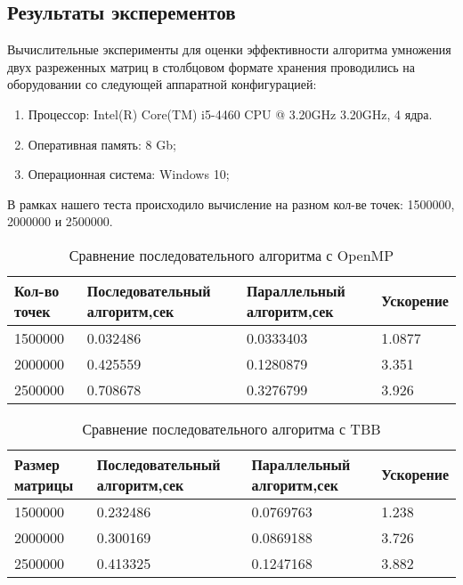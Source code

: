 \documentclass{report}
\begin{document}
\begin{center}
\section*{Результаты эксперементов}
\end{center}
\par Вычислительные эксперименты для оценки эффективности алгоритма умножения двух разреженных матриц в столбцовом формате хранения проводились на оборудовании со следующей аппаратной конфигурацией:
\begin{enumerate}
\item Процессор: Intel(R) Core(TM) i5-4460 CPU @ 3.20GHz 3.20GHz, 4 ядра.
\item Оперативная память: 8 Gb;
\item Операционная система: Windows 10;
\end{enumerate}
В рамках нашего теста происходило вычисление на разном кол-ве точек: 1500000, 2000000 и 2500000.
\begin{table}[!h]
\caption{Сравнение последовательного алгоритма с OpenMP}
\centering
\begin{tabular}{|p{4cm}|p{4cm}|p{4cm}|p{3cm}|}
\hline
Кол-во точек & Последовательный алгоритм,сек & Параллельный алгоритм,сек & Ускорение  \\\hline
1500000 & 0.032486 & 0.0333403 & 1.0877  \\\hline
2000000  & 0.425559 & 0.1280879 & 3.351  \\\hline
2500000  & 0.708678 & 0.3276799 & 3.926  \\\hline
\end{tabular}
\end{table}

\begin{table}[!h]
\caption{Сравнение последовательного алгоритма с TBB}
\centering
\begin{tabular}{|p{4cm}|p{4cm}|p{4cm}|p{3cm}|}
\hline
Размер матрицы & Последовательный алгоритм,сек & Параллельный алгоритм,сек & Ускорение  \\\hline
1500000  & 0.232486 & 0.0769763 & 1.238  \\\hline
2000000  & 0.300169 & 0.0869188 & 3.726  \\\hline
2500000  & 0.413325 & 0.1247168 & 3.882  \\\hline
\end{tabular}
\end{table}
\end{document}
